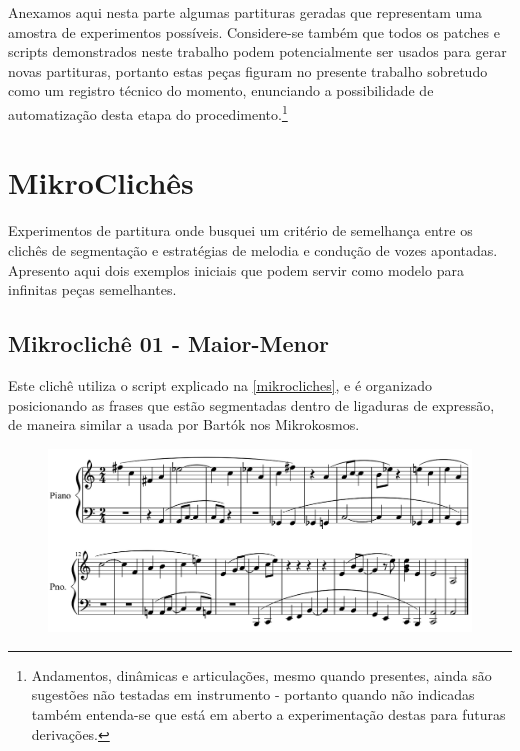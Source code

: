 \documentclass[
	12pt,				%
	openright,			%
	twoside,			%
	a4paper,			%
	english,			%
	french,				%
	spanish,			%
	brazil				%
	]{abntex2}
\begin{document}
Anexamos aqui nesta parte algumas partituras geradas que representam uma amostra de experimentos possíveis. Considere-se também que todos os patches e scripts demonstrados neste trabalho podem potencialmente ser usados para gerar novas partituras, portanto estas peças figuram no presente trabalho sobretudo como um registro técnico do momento, enunciando a possibilidade de automatização desta etapa do procedimento.\footnote{Andamentos, dinâmicas e articulações, mesmo quando presentes, ainda são sugestões não testadas em instrumento - portanto quando não indicadas também entenda-se que está em aberto a experimentação destas para futuras derivações.}

\section{MikroClichês}

Experimentos de partitura onde busquei um critério de semelhança entre os clichês de segmentação e estratégias de melodia e condução de vozes apontadas. Apresento aqui dois exemplos iniciais que podem servir como modelo para infinitas peças semelhantes.


\subsection{Mikroclichê 01 - Maior-Menor}

Este clichê utiliza o script explicado na \autoref{mikrocliches}, e é organizado posicionando as frases que estão segmentadas dentro de ligaduras de expressão, de maneira similar a usada por Bartók nos Mikrokosmos. 


\begin{figure}[!h]
	\begin{center}
	    \includegraphics*[scale=0.4]{score/MikroCliche01.png}
	\end{center}
\end{figure}
\end{document}
